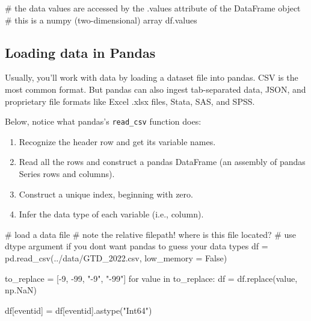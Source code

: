 \documentclass[
  letterpaper,
  DIV=11,
  numbers=noendperiod]{scrreprt}
\newenvironment{Shaded}{\begin{snugshade}}{\end{snugshade}}
\newcommand{\CommentTok}[1]{\textcolor[rgb]{0.37,0.37,0.37}{#1}}
\newcommand{\ControlFlowTok}[1]{\textcolor[rgb]{0.00,0.23,0.31}{#1}}
\newcommand{\DecValTok}[1]{\textcolor[rgb]{0.68,0.00,0.00}{#1}}
\newcommand{\KeywordTok}[1]{\textcolor[rgb]{0.00,0.23,0.31}{#1}}
\newcommand{\NormalTok}[1]{\textcolor[rgb]{0.00,0.23,0.31}{#1}}
\newcommand{\OperatorTok}[1]{\textcolor[rgb]{0.37,0.37,0.37}{#1}}
\newcommand{\StringTok}[1]{\textcolor[rgb]{0.13,0.47,0.30}{#1}}
\newcommand{\VariableTok}[1]{\textcolor[rgb]{0.07,0.07,0.07}{#1}}
\providecommand{\tightlist}{%
  \setlength{\itemsep}{0pt}\setlength{\parskip}{0pt}}\usepackage{longtable,booktabs,array}
\begin{document}
\begin{Shaded}
\begin{Highlighting}[]
\CommentTok{\# the data values are accessed by the .values attribute of the DataFrame object}
\CommentTok{\# this is a numpy (two{-}dimensional) array}
\NormalTok{df.values}
\end{Highlighting}
\end{Shaded}

\hypertarget{loading-data-in-pandas}{%
\subsection{Loading data in Pandas}\label{loading-data-in-pandas}}

Usually, you'll work with data by loading a dataset file into pandas.
CSV is the most common format. But pandas can also ingest tab-separated
data, JSON, and proprietary file formats like Excel .xlsx files, Stata,
SAS, and SPSS.

Below, notice what pandas's \texttt{read\_csv} function does:

\begin{enumerate}
\def\labelenumi{\arabic{enumi}.}
\tightlist
\item
  Recognize the header row and get its variable names.
\item
  Read all the rows and construct a pandas DataFrame (an assembly of
  pandas Series rows and columns).
\item
  Construct a unique index, beginning with zero.
\item
  Infer the data type of each variable (i.e., column).
\end{enumerate}

\begin{Shaded}
\begin{Highlighting}[]
\CommentTok{\# load a data file}
\CommentTok{\# note the relative filepath! where is this file located?}
\CommentTok{\# use dtype argument if you don\textquotesingle{}t want pandas to guess your data types}
\NormalTok{df }\OperatorTok{=}\NormalTok{ pd.read\_csv(}\StringTok{\textquotesingle{}../data/GTD\_2022.csv\textquotesingle{}}\NormalTok{, low\_memory }\OperatorTok{=} \VariableTok{False}\NormalTok{)}
\end{Highlighting}
\end{Shaded}

\begin{Shaded}
\begin{Highlighting}[]
\NormalTok{to\_replace }\OperatorTok{=}\NormalTok{ [}\OperatorTok{{-}}\DecValTok{9}\NormalTok{, }\OperatorTok{{-}}\DecValTok{99}\NormalTok{, }\StringTok{"{-}9"}\NormalTok{, }\StringTok{"{-}99"}\NormalTok{]}
\ControlFlowTok{for}\NormalTok{ value }\KeywordTok{in}\NormalTok{ to\_replace:}
\NormalTok{    df }\OperatorTok{=}\NormalTok{ df.replace(value, np.NaN)}

\NormalTok{df[}\StringTok{\textquotesingle{}eventid\textquotesingle{}}\NormalTok{] }\OperatorTok{=}\NormalTok{ df[}\StringTok{\textquotesingle{}eventid\textquotesingle{}}\NormalTok{].astype(}\StringTok{"Int64"}\NormalTok{)}
\end{Highlighting}
\end{Shaded}
\end{document}
